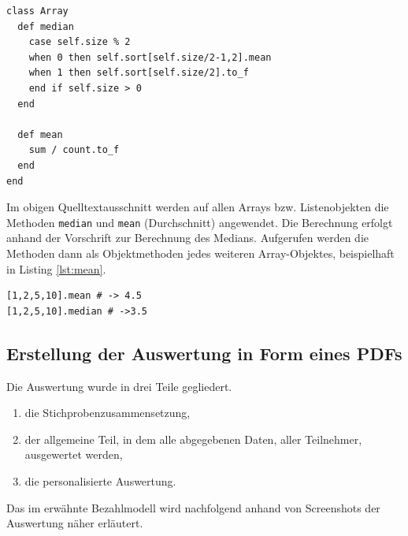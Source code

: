 \lstset{language=ruby}
\begin{lstlisting}[label=lst:median,caption=Auszug: Berechnung des Medians und des Durchschnitts]
class Array
  def median
    case self.size % 2 
    when 0 then self.sort[self.size/2-1,2].mean 
    when 1 then self.sort[self.size/2].to_f 
    end if self.size > 0            
  end

  def mean                                                                                                                                                   
    sum / count.to_f
  end 
end
\end{lstlisting}
Im obigen Quelltextausschnitt werden auf allen Arrays bzw. Listenobjekten die Methoden \texttt{median} und \texttt{mean} (Durchschnitt) angewendet. Die Berechnung erfolgt anhand der Vorschrift zur Berechnung des Medians.
Aufgerufen werden die Methoden dann als Objektmethoden jedes weiteren Array-Objektes, beispielhaft in Listing \ref{lst:mean}.
\begin{lstlisting}[label=lst:mean,caption=Beispiel des Durchschnitts und des Medians]
[1,2,5,10].mean # -> 4.5
[1,2,5,10].median # ->3.5
\end{lstlisting}
\newpage
\subsection{Erstellung der Auswertung in Form eines PDFs}
\label{sec:pdf_auswertung}
Die Auswertung wurde in drei Teile gegliedert. 
\begin{enumerate}
 \item die Stichprobenzusammensetzung,
 \item der allgemeine Teil, in dem alle abgegebenen Daten, aller Teilnehmer, ausgewertet werden,
 \item die personalisierte Auswertung.
\end{enumerate}
Das im
 erwähnte Bezahlmodell wird nachfolgend anhand von
Screenshots der Auswertung näher erläutert. 
